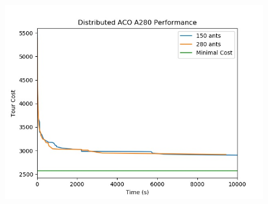 \documentclass[12pt]{article}
\begin{document}
\begin{figure}
    \includegraphics[scale=0.5]{a280_performance_vs_ants.jpg}
\end{figure}
\end{document}
